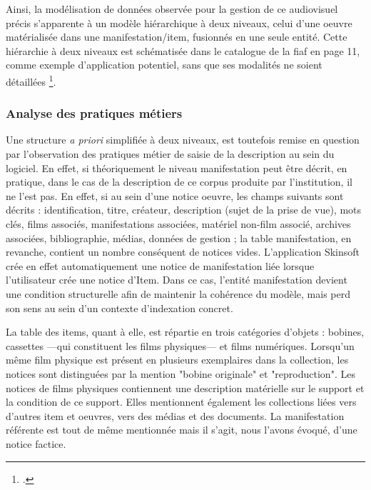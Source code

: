 Ainsi, la modélisation de données observée pour la gestion de ce audiovisuel précis s'apparente à un modèle hiérarchique à deux niveaux, celui d'une \gls{oeuvre} matérialisée dans une \gls{manifestation}/\gls{item}, fusionnés en une seule entité. Cette hiérarchie à deux niveaux est schématisée dans le catalogue de la \gls{fiaf} en page 11, comme exemple d'application potentiel, sans que ses modalités ne soient détaillées \footcite{zotero-item-646}. 


\subsubsection{Analyse des pratiques métiers}

Une structure \textit{a priori} simplifiée à deux niveaux, est toutefois remise en question par l'observation des pratiques métier de saisie de la description au sein du logiciel.
En effet, si théoriquement le niveau \gls{manifestation} peut être décrit, en pratique, dans le cas de la description de ce corpus produite par l’institution, il ne l’est pas. En effet, si au sein d'une notice \gls{oeuvre}, les champs suivants sont décrits : identification, titre, créateur, description (sujet de la prise de vue), mots clés, films associés, manifestations associées, matériel non-film associé, archives associées, bibliographie, médias, données de gestion ; la table \gls{manifestation}, en revanche, contient un nombre conséquent de notices vides. L'application Skinsoft crée en effet automatiquement une notice de \gls{manifestation} liée lorsque l'utilisateur crée une notice d'Item. Dans ce cas, l’entité \gls{manifestation} devient une condition structurelle afin de maintenir la cohérence du modèle, mais perd son sens au sein d’un contexte d'indexation concret. 

La table des items, quant à elle, est répartie en trois catégories d'objets : bobines, cassettes ---qui constituent les films physiques--- et films numériques. Lorsqu'un même film physique est présent en plusieurs exemplaires dans la collection, les notices sont distinguées par la mention "bobine originale" et "reproduction". Les notices de films physiques contiennent une description matérielle sur le support et la condition de ce support. Elles mentionnent également les collections liées vers d'autres \gls{item} et \gls{oeuvre}s, vers des médias et des documents. La manifestation référente est tout de même mentionnée mais il s'agit, nous l'avons évoqué, d'une notice factice. 

